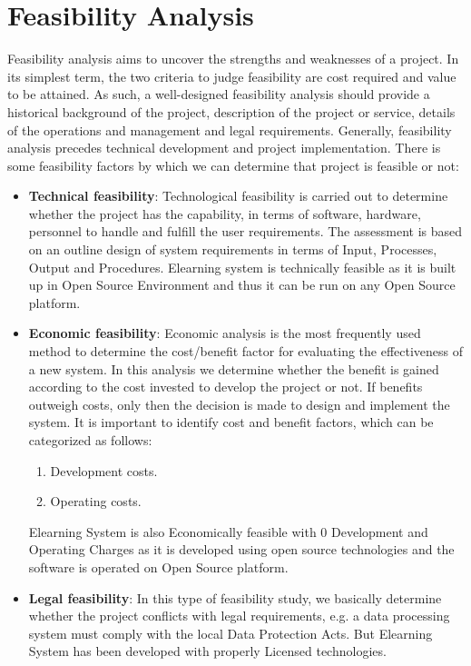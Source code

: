 \section{Feasibility Analysis}
Feasibility analysis aims to uncover the strengths and weaknesses of 
a project. In its simplest term, the two criteria to judge feasibility 
are cost required and value to be attained. As such, a well-designed 
feasibility analysis should provide a historical background of the 
project, description of the project or service, details of the 
operations and management and legal requirements. Generally, feasibility 
analysis precedes technical development and project implementation. 
There is some feasibility factors by which we can determine that 
project is feasible or not:
\begin{itemize}
\item {\bf{Technical feasibility}}: Technological feasibility is carried 
out to determine whether the project has the capability, in terms of 
software, hardware, personnel to handle and fulfill the user 
requirements. The assessment is based on an outline design of system 
requirements in terms of Input, Processes, Output and Procedures. Elearning system is technically feasible as it is built up in Open 
Source Environment and thus it can be run on any Open Source platform.
\item {\bf{Economic feasibility}}: Economic analysis is the most 
frequently used method to determine the cost/benefit factor for 
evaluating the effectiveness of a new system. In this analysis we 
determine whether the benefit is gained according to the cost invested 
to develop the project or not. If benefits outweigh costs, only then 
the decision is made to design and implement the system. It is 
important to identify cost and benefit factors, which can be categorized 
as follows:
\begin{enumerate}
\item Development costs.
\item Operating costs.
\end{enumerate}
Elearning System is also Economically feasible with 0 Development 
and Operating Charges as it is developed using open source technologies and the software is operated on Open 
Source platform.
\item {\bf {Legal feasibility}}: In this type of feasibility study, we 
basically determine whether the project conflicts with legal 
requirements, e.g. a data processing system must comply with the local 
Data Protection Acts. But Elearning System has been developed with properly Licensed technologies. 

\end{itemize}
